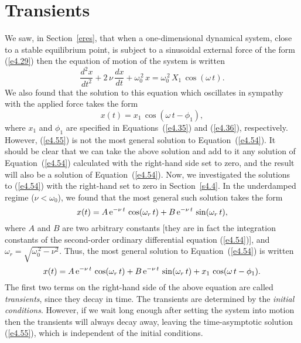 \section{Transients}\label{strans}
We saw, in Section~\ref{eres}, that when a one-dimensional dynamical system,
close to a stable equilibrium point, is subject to a sinusoidal external
force of the form (\ref{e4.29}) then the equation of motion of the
system is written
\begin{equation}\label{e4.54}
\frac{d^2 x}{dt^2} + 2\,\nu\,\frac{dx}{dt} + \omega_0^{\,2}\,x
= \omega_0^{\,2}\,X_1\,\cos(\omega\,t).
\end{equation}
We also found that the solution to this equation which oscillates in sympathy
with the applied force takes the form
\begin{equation}\label{e4.55}
x(t) = x_1\,\cos(\omega\,t-\phi_1),
\end{equation}
where $x_1$ and $\phi_1$ are specified in Equations~(\ref{e4.35}) and (\ref{e4.36}), respectively.
However, (\ref{e4.55}) is not the most general solution to Equation~(\ref{e4.54}).
It should be clear that we can take the above solution and add to it
any solution of Equation~(\ref{e4.54}) calculated with the right-hand side set to zero,
and the result will also be a solution of Equation~(\ref{e4.54}). 
Now, we investigated the solutions to (\ref{e4.54}) with the right-hand
set to zero in Section~\ref{s4.4}. In the underdamped regime ($\nu<\omega_0$),
we found that the most general such solution takes the
form
\begin{equation}
x(t) = A\,{\rm e}^{-\nu\,t}\,\cos(\omega_r\,t) + B\,{\rm e}^{-\nu\,t}\,
\sin(\omega_r\,t),
\end{equation}
where $A$ and $B$ are two arbitrary constants [they are in fact the integration constants
 of the second-order ordinary differential equation (\ref{e4.54})],
and $\omega_r = \sqrt{\omega_0^{\,2}-\nu^2}$. Thus,
the most general solution to Equation~(\ref{e4.54}) is written
\begin{equation}\label{e4.56}
x(t) = A\,{\rm e}^{-\nu\,t}\,\cos(\omega_r\,t) + B\,{\rm e}^{-\nu\,t}\,
\sin(\omega_r\,t) + x_1\,\cos(\omega\,t-\phi_1).
\end{equation}
The first two terms on the right-hand side of the above equation
are called {\em transients}, since they decay in time. The transients
are determined by the {\em initial conditions}. However, if we wait
long enough after setting the system into motion then the transients will 
always decay away, leaving the time-asymptotic solution (\ref{e4.55}), which is independent of the
initial conditions.

